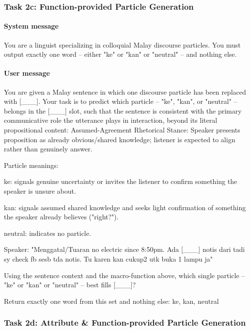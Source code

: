 \documentclass[11pt]{article}
\begin{document}
\subsubsection{Task 2c: Function-provided Particle Generation}

\paragraph{System message}
\begin{PromptBlock}
You are a linguist specializing in colloquial Malay discourse particles. You must output exactly one word -- either "ke" or "kan" or "neutral" -- and nothing else.
\end{PromptBlock}

\paragraph{User message}
\begin{PromptBlock}
You are given a Malay sentence in which one discourse particle has been replaced with [\_\_\_].
Your task is to predict which particle -- "ke", "kan", or "neutral" -- belongs in the [\_\_\_] slot, such that the sentence is consistent with the primary communicative role the utterance plays in interaction, beyond its literal propositional content:
  Assumed-Agreement Rhetorical Stance: Speaker presents proposition as already obvious/shared knowledge; listener is expected to align rather than genuinely answer.


Particle meanings:

ke: signals genuine uncertainty or invites the listener to confirm something the speaker is unsure about.

kan: signals assumed shared knowledge and seeks light confirmation of something the speaker already believes ("right?").

neutral: indicates no particle.

Speaker: "Menggatal/Tuaran no electric since 8:50pm. Ada [\_\_\_] notis dari tadi sy check fb sesb tda notis. Tu karen kan cukup2 utk buka 1 lampu ja"

Using the sentence context and the macro-function above, which single particle -- "ke" or "kan" or "neutral" -- best fills [\_\_\_]?

Return exactly one word from this set and nothing else: ke, kan, neutral
\end{PromptBlock}



\subsubsection{Task 2d: Attribute \& Function-provided Particle Generation}
\end{document}
